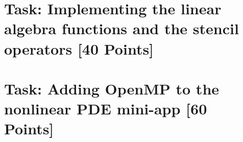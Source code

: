 \documentclass[unicode,11pt,a4paper,oneside,numbers=endperiod,openany]{scrartcl}
\begin{document}
\setassignment
{}

\newline

\assignmentpolicy

\section{Task: Implementing the linear algebra functions and the stencil operators [40 Points]}


\section{Task:  Adding OpenMP to the nonlinear PDE mini-app [60 Points]}
\end{document}
